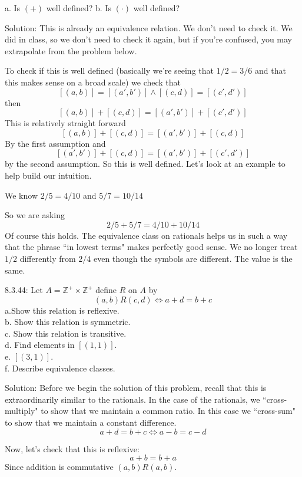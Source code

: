 \documentclass[16 pt]{amsart}
\theoremstyle{definition}
\theoremstyle{remark}
\numberwithin{equation}{subsection}
\newcommand{\Z}{\mathbb{Z}}
\begin{document}
a. Is $(+)$ well defined?
b. Is $(\cdot)$ well defined?

\vspace{1in}

Solution: This is already an equivalence relation.  We don't need to check it.  We did in class, so we don't need to check it again, but if you're confused, you may extrapolate from the problem below.

To check if this is well defined (basically we're seeing that $1/2 = 3/6$ and that this makes sense on a broad scale) we check that 
\[
[(a,b)] = [(a',b')] \wedge [(c,d)] = [(c',d')] 
\]
then
\[
[(a,b)]+[(c,d)] = [(a',b')]+[(c',d')]
\]
This is relatively straight forward
\[
[(a,b)]+[(c,d)] = [(a',b')]+[(c,d)]
\]
By the first assumption and
\[
[(a',b')]+[(c,d)] = [(a',b')]+[(c',d')]
\]
by the second assumption.  So this is well defined.  Let's look at an example to help build our intuition.

We know $2/5=4/10$ and $5/7= 10/14$

So we are asking
\[
2/5 + 5/7 = 4/10 + 10/14
\]
Of course this holds.  The equivalence class on rationals helps us in such a way that the phrase ``in lowest terms" makes perfectly good sense.  We no longer treat $1/2$ differently from $2/4$ even though the symbols are different.  The value is the same.

\newpage



8.3.44: Let $A= \Z^+ \times \Z^+$ define $R$ on $A$ by
\[
(a,b)R(c,d) \iff a+d = b+c
\]
a.Show this relation is reflexive.\\
b. Show this relation is symmetric.\\
c. Show this relation is transitive.\\
d. Find elements in $[(1,1)]$.\\
e. $[(3,1)]$.\\
f. Describe equivalence classes.

\vspace{1in}

Solution: Before we begin the solution of this problem, recall that this is extraordinarily similar to the rationals.  In the case of the rationals, we ``cross-multiply" to show that we maintain a common ratio.  In this case we ``cross-sum" to show that we maintain a constant difference.
\[
a+d = b+c  \iff a-b = c-d
\]

Now, let's check that this is reflexive:
\[
a+b = b+a 
\]
Since addition is commutative $(a,b) R (a,b)$.
\end{document}
